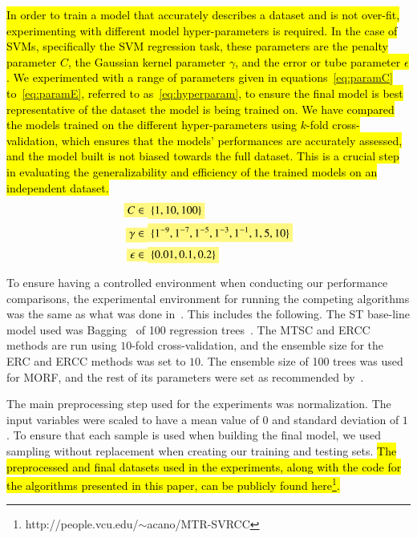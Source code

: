 \documentclass[preprint,12pt]{elsarticle}
\newcommand{\highlight}[1]{%
  \colorbox{yellow!50}{$\displaystyle#1$}}
\begin{document}
\hl{In order to train a model that accurately describes a dataset and is not over-fit, experimenting with different model hyper-parameters is required. In the case of SVMs, specifically the SVM regression task, these parameters are the penalty parameter $C$, the Gaussian kernel parameter $\gamma$, and the error or tube parameter $\epsilon$. We experimented with a range of parameters given in equations~{\eqref{eq:paramC}} to~{\eqref{eq:paramE}}, referred to as~{\eqref{eq:hyperparam}}, to ensure the final model is best representative of the dataset the model is being trained on. We have compared the models trained on the different hyper-parameters using $k$-fold cross-validation, which ensures that the models' performances are accurately assessed, and the model built is not biased towards the full dataset. This is a crucial step in evaluating the generalizability and efficiency of the trained models on an independent dataset.}
\begin{subequations}
\label{eq:hyperparam}
\begin{align}
\highlight{C \in}  & \highlight{\{1, 10, 100\}} \label{eq:paramC}\\
\highlight{\gamma \in}  & \highlight{\{1^{-9}, 1^{-7}, 1^{-5}, 1^{-3}, 1^{-1}, 1, 5, 10\}} \label{eq:paramG}\\
\highlight{\epsilon \in}  & \highlight{\{0.01, 0.1, 0.2\}} \label{eq:paramE}
\end{align}
\end{subequations}

To ensure having a controlled environment when conducting our performance comparisons, the experimental environment for running the competing algorithms was the same as what was done in~\cite{Spyromitros2014}. This includes the following. The ST base-line model used was Bagging~\cite{Breiman1996} of 100 regression trees~\cite{Wu2015430}. The MTSC and ERCC methods are run using $10$-fold cross-validation, and the ensemble size for the ERC and ERCC methods was set to $10$. The ensemble size of 100 trees was used for MORF, and the rest of its parameters were set as recommended by~\cite{Kocev2013}.

The main preprocessing step used for the experiments was normalization. The input variables were scaled to have a mean value of $0$ and standard deviation of $1$. To ensure that each sample is used when building the final model, we used sampling without replacement when creating our training and testing sets. \hl{The preprocessed and final datasets used in the experiments, along with the code for the algorithms presented in this paper, can be publicly found here\footnote{http://people.vcu.edu/$\sim$acano/MTR-SVRCC}.}
\end{document}
